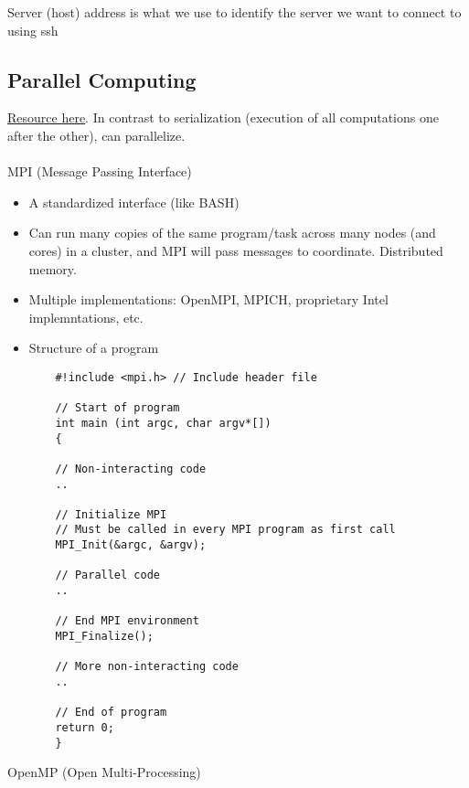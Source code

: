\documentclass[12pt]{article}
\theoremstyle{plain}
\theoremstyle{definition}
\theoremstyle{remark}
\begin{document}
Server (host) address is what we use to identify the server we want to
connect to using ssh


\clearpage
\subsection{Parallel Computing}

\href{https://princetonuniversity.github.io/PUbootcamp/sessions/parallel-programming/Intro_PP_bootcamp_2018.pdf}{Resource here}.
In contrast to serialization (execution of all computations one after
the other), can parallelize.
\\
\\
MPI (Message Passing Interface)
\begin{itemize}
  \item A standardized interface (like BASH)
  \item
    Can run many copies of the same program/task across many nodes (and
    cores) in a cluster, and MPI will pass messages to coordinate.
    Distributed memory.
  \item Multiple implementations:
    OpenMPI, MPICH, proprietary Intel implemntations, etc.
  \item Structure of a program
    \begin{lstlisting}
    #!include <mpi.h> // Include header file

    // Start of program
    int main (int argc, char argv*[])
    {

    // Non-interacting code
    ..

    // Initialize MPI
    // Must be called in every MPI program as first call
    MPI_Init(&argc, &argv);

    // Parallel code
    ..

    // End MPI environment
    MPI_Finalize();

    // More non-interacting code
    ..

    // End of program
    return 0;
    }

    \end{lstlisting}
\end{itemize}
OpenMP (Open Multi-Processing)
\end{document}
